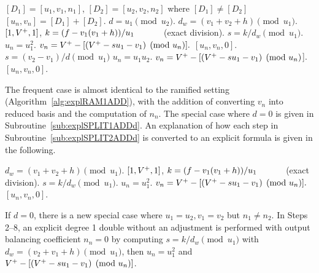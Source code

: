 \begin{algorithm}[htbp]
\caption{Genus 2 Split Model Degree 1 Addition\label{alg:explSPLIT1ADD}}
\begin{algorithmic} [1]
\Require $[D_1] = [u_1,v_1,n_1]$, $[D_2] = [u_2,v_2,n_2]$ where $[D_1] \not = [D_2]$ \smallskip
\Ensure $[u_n,v_n] = [D_1] + [D_2] $.
\algrule
\State $d = u_1 \pmod{u_2}$.
    \State $d_w = (v_1 + v_2 + h) \pmod{u_1}$.
    \State \Return $[1,V^{+},1]$,
    \Else
        \State $k = (f - v_1(v_1 + h))/u_1 \quad\quad\quad$ (exact division).
        \State $s = k/d_w \pmod{u_1}$.
        \State $u_n = u_1^2$.
        \State $v_n = V^{+} - [(V^{+} - su_1 - v_1) \pmod{u_n}].$
        \State \Return $[u_n,v_n,0]$.
    \EndIf
\EndIf
\State $s = (v_2 - v_1)/d \pmod{u_1}$
\State $u_n = u_1u_2$.
\State $v_n = V^{+} - [(V^{+} - su_1 - v_1) \pmod{u_n}$].
\State \Return $[u_n,v_n,0]$.
\end{algorithmic}
\end{algorithm}

The frequent case is almost identical to the ramified setting
(Algorithm~\ref{alg:explRAM1ADD}), with the addition of converting $v_n$ into
reduced basis and the computation of $n_n$. The special case where $d=0$ is given
in Subroutine~\ref{sub:explSPLIT1ADDd}. An explanation of how each step in
Subroutine~\ref{sub:explSPLIT2ADDd} is converted to an explicit formula is given
in the following. 

\begin{algorithm}[htbp]
\caption{Genus 2 Split Model Degree 1 Addition $(d = 0)$ \label{sub:explSPLIT1ADDd}}
\begin{algorithmic} [1]
\State $d_w = (v_1 + v_2 + h) \pmod{u_1}$.
\State \Return $[1,V^{+},1]$,
\Else
    \State $k = (f - v_1(v_1 + h))/u_1 \quad\quad\quad$ (exact division).
    \State $s = k/d_w \pmod{u_1}$.
    \State $u_n = u_1^2$.
    \State $v_n = V^{+} - [(V^{+} - su_1 - v_1) \pmod{u_n}].$
    \State \Return $[u_n,v_n,0]$.
\EndIf
\end{algorithmic}
\end{algorithm}



If $d = 0$, there is a new special case where $u_1 = u_2, v_1 = v_2$ but $n_1
\not = n_2$. In Steps 2--8, an explicit degree 1 double without an adjustment is
performed with output balancing coefficient $n_n=0$ by computing $s = k/d_w
\pmod{u_1}$ with $d_w = (v_2 + v_1 + h) \pmod{u_1}$, then $u_n = u_1^2$ and $V^{+}
- [(V^{+} - su_1 - v_1) \pmod{u_n}]$. 


